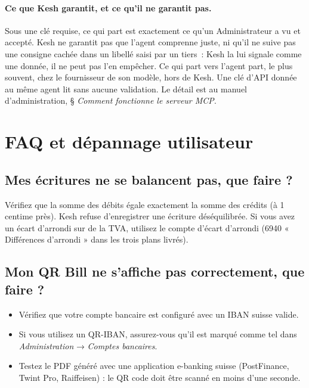 \documentclass[a4paper,11pt,oneside]{article}
\begin{document}
\paragraph{Ce que Kesh garantit, et ce qu'il ne garantit pas.} Sous une clé requise, ce qui
part est exactement ce qu'un Administrateur a vu et accepté. Kesh ne garantit pas que l'agent
comprenne juste, ni qu'il ne suive pas une consigne cachée dans un libellé saisi par un tiers~:
Kesh la lui signale comme une donnée, il ne peut pas l'en empêcher. Ce qui part vers l'agent
part, le plus souvent, chez le fournisseur de son modèle, hors de Kesh. Une clé d'API donnée au
même agent lit sans aucune validation. Le détail est au manuel d'administration, § \emph{Comment
fonctionne le serveur MCP}.

\section{FAQ et dépannage utilisateur}

\subsection{Mes écritures ne se balancent pas, que faire ?}

Vérifiez que la somme des débits égale exactement la somme des crédits (à 1 centime près). Kesh refuse d'enregistrer une écriture déséquilibrée. Si vous avez un écart d'arrondi sur de la TVA, utilisez le compte d'écart d'arrondi (6940 « Différences d'arrondi » dans les trois plans livrés).

\subsection{Mon QR Bill ne s'affiche pas correctement, que faire ?}

\begin{itemize}
    \item Vérifiez que votre compte bancaire est configuré avec un IBAN suisse valide.
    \item Si vous utilisez un QR-IBAN, assurez-vous qu'il est marqué comme tel dans \emph{Administration} → \emph{Comptes bancaires}.
    \item Testez le PDF généré avec une application e-banking suisse (PostFinance, Twint Pro, Raiffeisen) : le QR code doit être scanné en moins d'une seconde.
\end{itemize}
\end{document}

